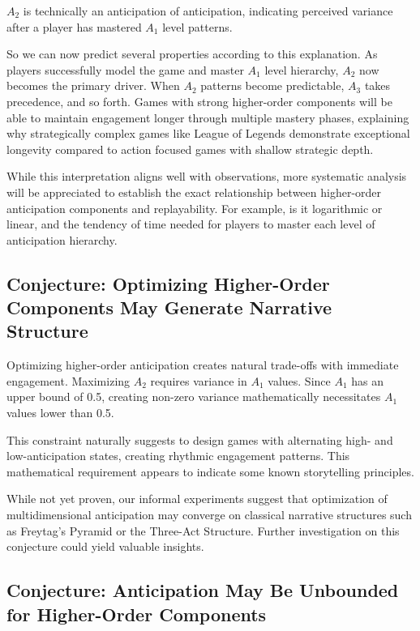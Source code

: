 \documentclass{article}
\begin{document}
$A_2$ is technically an anticipation of anticipation, indicating perceived variance after a player has mastered $A_1$ level patterns.

So we can now predict several properties according to this explanation.
As players successfully model the game and master $A_1$ level hierarchy, $A_2$ now becomes the primary driver. When $A_2$ patterns become predictable, $A_3$ takes precedence, and so forth.
Games with strong higher-order components will be able to maintain engagement longer through multiple mastery phases, explaining why strategically complex games like League of Legends demonstrate exceptional longevity compared to action focused games with shallow strategic depth.

While this interpretation aligns well with observations, more systematic analysis will be appreciated to establish the exact relationship between higher-order anticipation components and replayability.
For example, is it logarithmic or linear, and the tendency of time needed for players to master each level of anticipation hierarchy.

\subsection{Conjecture: Optimizing Higher-Order Components May Generate Narrative Structure}

Optimizing higher-order anticipation creates natural trade-offs with immediate engagement. Maximizing $A_2$ requires variance in $A_1$ values. Since $A_1$ has an upper bound of 0.5, creating non-zero variance mathematically necessitates $A_1$ values lower than 0.5.

This constraint naturally suggests to design games with alternating high- and low-anticipation states, creating rhythmic engagement patterns. This mathematical requirement appears to indicate some known storytelling principles.

While not yet proven, our informal experiments suggest that optimization of multidimensional anticipation may converge on classical narrative structures such as Freytag's Pyramid or the Three-Act Structure.
Further investigation on this conjecture could yield valuable insights.

\subsection{Conjecture: Anticipation May Be Unbounded for Higher-Order Components}
\end{document}

